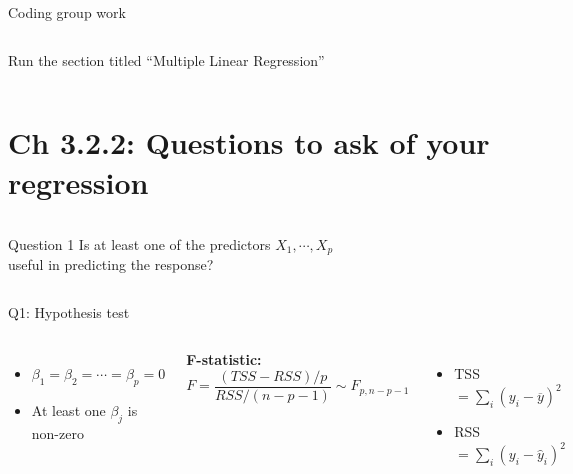 \documentclass[aspectratio=169,usenames,dvipsnames]{beamer}
\newcommand{\InstructorList}[1]{
\begin{itemize}
	\color{orange}
	#1
\end{itemize}
}
\begin{document}
{
\begin{frame}[t]{Coding group work}
\begin{columns}
\centering
Run the section titled ``Multiple Linear Regression''
\centering
\end{columns}
\end{frame}
}


\section{Ch 3.2.2: Questions to ask of your regression}

\begin{frame}

\begin{columns}
\centering
\begin{block}
	{Question 1}
	\centering 
Is at least one of the predictors $X_1, \cdots, X_p$ \\
useful in predicting the response?
\end{block}

\end{columns}

\end{frame}
\begin{frame}[t]{Q1: Hypothesis test}

\begin{columns}
\centering
\begin{itemize}
	\item [$H_0 : $] $\beta_1 = \beta_2 = \cdots = \beta_p = 0$
	\item [$H_a:$] At least one $\beta_j$ is non-zero
\end{itemize}

\centering

\textbf{F-statistic:}
\begin{equation*}
	F = \frac{(TSS-RSS)/p}{RSS/(n-p-1)} \sim F_{p,n- p - 1}
\end{equation*}

\InstructorList{
\item TSS $= \sum_i (y_i - \overline y)^2$
\item RSS $= \sum_i (y_i - \hat y_i)^2$
}

\end{columns}

\end{frame}
\end{document}
